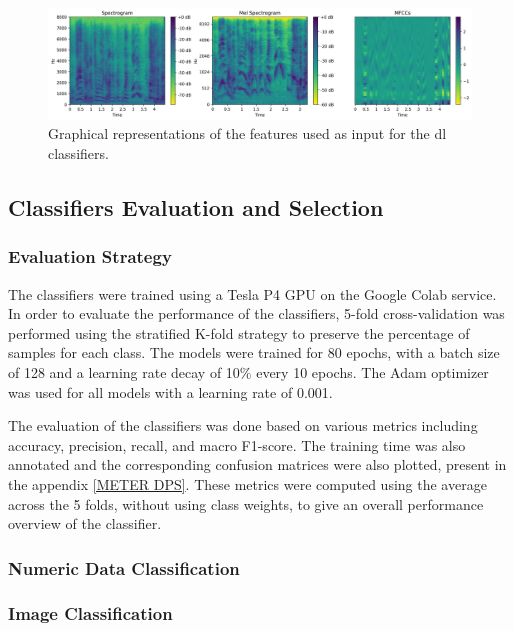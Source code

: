 \begin{figure}[H]
	\centering
	\includegraphics[width=\textwidth]{figs/4_4_deep_learning/features.png}
	\caption{Graphical representations of the features used as input for the \ac{dl} classifiers.}
	\label{fig:dl_features}
\end{figure}



\subsection{Classifiers Evaluation and Selection}

\subsubsection{Evaluation Strategy}

The classifiers were trained using a Tesla P4 GPU on the Google Colab service. In order to evaluate the performance of the classifiers, 5-fold cross-validation was performed using the stratified K-fold strategy to preserve the percentage of samples for each class. The models were trained for 80 epochs, with a batch size of 128 and a learning rate decay of 10\% every 10 epochs. The Adam optimizer was used for all models with a learning rate of 0.001.

The evaluation of the classifiers was done based on various metrics including accuracy, precision, recall, and macro F1-score. The training time was also annotated and the corresponding confusion matrices were also plotted, present in the appendix \ref{METER DPS}. These metrics were computed using the average across the 5 folds, without using class weights, to give an overall performance overview of the classifier.

\subsubsection{Numeric Data Classification}


\subsubsection{Image Classification}

